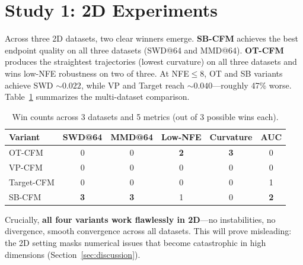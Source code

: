 \section{Study 1: 2D Experiments}
\label{sec:study1}

Across three 2D datasets, two clear winners emerge. \textbf{SB-CFM} achieves the best endpoint quality on all three datasets (SWD@64 and MMD@64). \textbf{OT-CFM} produces the straightest trajectories (lowest curvature) on all three datasets and wins low-NFE robustness on two of three. At NFE${\leq}8$, OT and SB variants achieve SWD ${\sim}0.022$, while VP and Target reach ${\sim}0.040$---roughly 47\% worse. Table~\ref{tab:wins} summarizes the multi-dataset comparison.

\begin{table}[H]
\centering
\caption{Win counts across 3 datasets and 5 metrics (out of 3 possible wins each).}
\label{tab:wins}
\small
\begin{tabular}{@{}lccccc@{}}
\toprule
Variant & SWD@64 & MMD@64 & Low-NFE & Curvature & AUC \\
\midrule
OT-CFM & 0 & 0 & \textbf{2} & \textbf{3} & 0 \\
VP-CFM & 0 & 0 & 0 & 0 & 0 \\
Target-CFM & 0 & 0 & 0 & 0 & 1 \\
SB-CFM & \textbf{3} & \textbf{3} & 1 & 0 & \textbf{2} \\
\bottomrule
\end{tabular}
\end{table}

Crucially, \textbf{all four variants work flawlessly in 2D}---no instabilities, no divergence, smooth convergence across all datasets. This will prove misleading: the 2D setting masks numerical issues that become catastrophic in high dimensions (Section~\ref{sec:discussion}).
